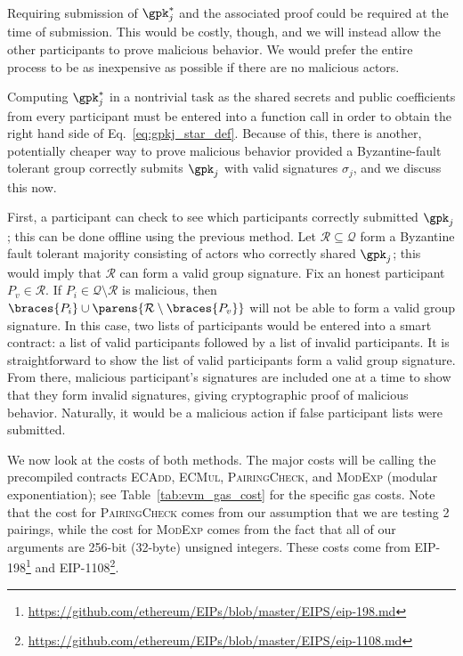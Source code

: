 \noindent
Requiring submission of $\gpk_{j}^{*}$ and the associated
proof could be required at the time of submission.
This would be costly, though, and we will instead allow
the other participants to prove malicious behavior.
We would prefer the entire process to be as inexpensive
as possible if there are no malicious actors.

Computing $\gpk_{j}^{*}$ in a nontrivial task as
the shared secrets and public coefficients
from every participant must be entered into a function call
in order to obtain the right hand side of
Eq.~\eqref{eq:gpkj_star_def}.
Because of this, there is another, potentially cheaper way to prove malicious
behavior provided a Byzantine-fault tolerant group
correctly submits $\gpk_{j}$ with valid signatures $\sigma_{j}$,
and we discuss this now.

First, a participant can check to see which participants
correctly submitted $\gpk_{j}$;
this can be done offline using the previous method.
Let $\mathcal{R}\subseteq\mathcal{Q}$ form a Byzantine fault tolerant
majority consisting of actors who correctly shared $\gpk_{j}$;
this would imply that $\mathcal{R}$ can form a valid group signature.
Fix an honest participant $P_{v}\in\mathcal{R}$.
If $P_{i}\in\mathcal{Q}\setminus\mathcal{R}$ is malicious,
then $\braces{P_{i}}\cup\parens{\mathcal{R}\setminus \braces{P_{v}}}$
will not be able to form a valid group signature.
In this case, two lists of participants would be entered into a smart
contract: a list of valid participants followed by a list of
invalid participants.
It is straightforward to show the list of valid
participants form a valid group signature.
From there, malicious participant's signatures are included 
one at a time to show that they form invalid signatures,
giving cryptographic proof of malicious behavior.
Naturally, it would be a malicious action if false participant
lists were submitted.

We now look at the costs of both methods.
The major costs will be calling the precompiled contracts
\textsc{ECAdd}, \textsc{ECMul}, \textsc{PairingCheck},
and \textsc{ModExp} (modular exponentiation);
see Table~\ref{tab:evm_gas_cost} for the specific gas costs.
Note that the cost for \textsc{PairingCheck} comes
from our assumption that we are testing 2 pairings,
while the cost for \textsc{ModExp} comes from the fact
that all of our arguments are 256-bit (32-byte) unsigned integers.
These costs come from EIP-198\footnote{
    \url{https://github.com/ethereum/EIPs/blob/master/EIPS/eip-198.md}}
and EIP-1108\footnote{
    \url{https://github.com/ethereum/EIPs/blob/master/EIPS/eip-1108.md}}.

